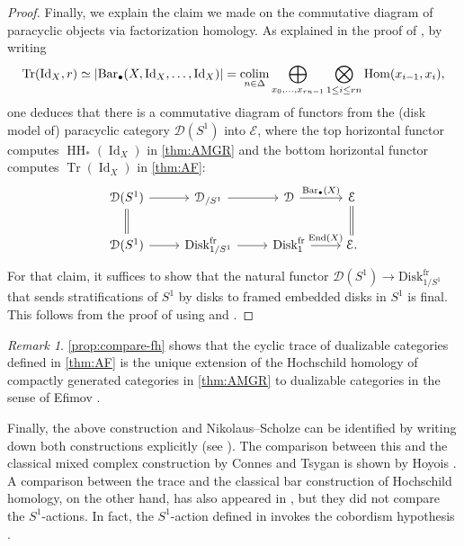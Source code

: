 \documentclass[11pt]{amsart}
\numberwithin{equation}{section}
\theoremstyle{plain}
\theoremstyle{definition}
\theoremstyle{remark}
\newtheorem{RMK}[rmk]{Remark}
\newcommand{\cD} { {\mathcal{D}}}
\newcommand{\cE} { {\mathcal{E}}}
\newcommand{\Id}{{\operatorname{Id}}}
\newcommand{\colim}{\operatornamewithlimits{colim}}
\newcommand\End{\operatorname{End}}
\newcommand\HH{\operatorname{HH}}
\newcommand\Tr{\operatorname{Tr}}
\newcommand\Hom{\operatorname{Hom}}
\begin{document}
\begin{proof}
    Finally, we explain the claim we made on the commutative diagram of paracyclic objects via factorization homology. As explained in the proof of \cite[Proposition B.12]{Ayala-Francis-FH-dim1}, by writing
    \[\Tr(\Id_X, r) \simeq |\mathrm{Bar}_\bullet(X, \Id_X, \dots, \Id_X)| = \colim_{n\in \Delta}\bigoplus_{x_0,\dots,x_{rn-1} }\bigotimes_{1\leq i\leq rn}\Hom(x_{i-1}, x_i),\]
    one deduces that there is a commutative diagram of functors from the (disk model of) paracyclic category $\cD(S^1)$ into $\cE$, where the top horizontal functor computes $\HH_*(\Id_X)$ in  \autoref{thm:AMGR} and the bottom horizontal functor computes $\Tr(\Id_X)$ in \autoref{thm:AF}:
    \[\begin{tikzcd}
    \cD(S^1) \ar[r] \ar[equal,d] & \cD_{/S^1} \ar[r] & \cD \ar[r, "\mathrm{Bar}_\bullet(X)"] & \cE \ar[equal,d] \\
    \cD(S^1) \ar[r] & \mathrm{Disk}^\mathrm{fr}_{1/S^1} \ar[r] & \mathrm{Disk}^\mathrm{fr}_1 \ar[r, "\End(X)"] & \cE.
    \end{tikzcd}\]
    For that claim, it suffices to show that the natural functor $\cD(S^1) \to \mathrm{Disk}^\mathrm{fr}_{1/S^1}$ that sends stratifications of $S^1$ by disks to framed embedded disks in $S^1$ is final. This follows from the proof of \cite[Proposition B.12]{Ayala-Francis-FH-dim1} using \cite[Lemma 2.3.2]{Ayala-Francis-PD} and \cite[Observation B.8]{Ayala-Francis-FH}.
\end{proof}

\begin{RMK}
     \autoref{prop:compare-fh} shows that the cyclic trace of dualizable categories defined in  \autoref{thm:AF} \cite{Ayala-Francis-FH-dim1} is the unique extension of the Hochschild homology of compactly generated categories in \autoref{thm:AMGR} \cite{AMGR-FH-enriched,Nikolaus-Scholze-Ontopologicalcyclichomology} to dualizable categories in the sense of Efimov \cite[Theorem 0.1]{Efimov-K-theory}.
\end{RMK}

Finally, the above construction \cite{AMGR-FH-enriched} and Nikolaus--Scholze \cite{Nikolaus-Scholze-Ontopologicalcyclichomology} can be identified by writing down both constructions explicitly (see \cite[Section 0.3]{AMGR-FH-enriched}). The comparison between this and the classical mixed complex construction by Connes and Tsygan is shown by Hoyois \cite{Hoyois}. A comparison between the trace and the classical bar construction of Hochschild homology, on the other hand, has also appeared in \cite[Proposition 4.24]{Hoyois-Scherotzke-Sibilla}, but they did not compare the $S^1$-actions. In fact, the $S^1$-action defined in \cite[Proposition 2.16]{Hoyois-Scherotzke-Sibilla} invokes the cobordism hypothesis \cite{Lurie-cobordism}.
\end{document}
